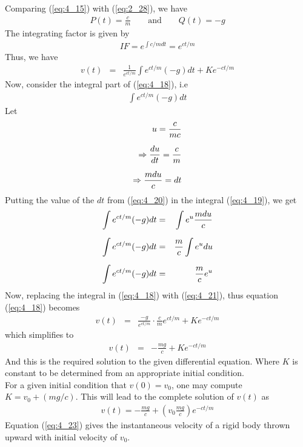 \documentclass[11pt]{report}
\newcommand{\sps}{\\[0.2cm]}
\newcommand{\refn}[1]{(\ref{#1})}
\newcommand{\refx}[1]{\refn{eq:#1}}
\newcommand{\NI}{\noindent}
\begin{document}
	\NI Comparing \refx{4_15} with \refx{2_28}, we have
	\begin{eqnarray}
		P(t) = \frac{c}{m}\qquad\text{and}\qquad Q(t) = -g\label{eq:4_16}
	\end{eqnarray}	
	The integrating factor is given by
	\begin{eqnarray}
		IF = e^{\int c/m dt} = e^{ct/m}  \label{eq:4_17}
	\end{eqnarray}
	Thus, we have
	\begin{eqnarray}
		v(t) &=& \frac{1}{e^{ct/m}}\int e^{ct/m}(-g)dt +Ke^{-ct/m}\label{eq:4_18}
	\end{eqnarray}
	Now, consider the integral part of \refx{4_18}, i.e
	\begin{eqnarray}
		\int e^{ct/m}(-g)dt\label{eq:4_19}
	\end{eqnarray}
	Let
	\begin{eqnarray}
		u = \frac{c}{mc}\notag\sps
		\Rightarrow \frac{du}{dt} = \frac{c}{m}\notag\sps
		\Rightarrow \frac{mdu}{c} = dt\label{eq:4_20}
	\end{eqnarray}
	Putting the value of the $dt$ from \refx{4_20} in the integral \refx{4_19}, we get
	\begin{eqnarray}
		\int e^{ct/m}(-g)dt &=& \int e^u\notag \frac{mdu}{c}\sps
		\int e^{ct/m}(-g)dt&=& \frac{m}{c}\int e^u du\notag\sps
		\int e^{ct/m}(-g)dt&=& \frac{m}{c}e^u\label{eq:4_21}
	\end{eqnarray}
	Now, replacing the integral in \refx{4_18} with \refx{4_21}, thus equation \refx{4_18} becomes
	\begin{eqnarray*}
		v(t) &=& \frac{-g}{e^{ct/m}} \cdot \frac{c}{m}e^{ct/m}+ Ke^{-ct/m}
	\end{eqnarray*}
	which simplifies to
	\begin{eqnarray}
		v(t) &=& -\frac{mg}{c} + Ke^{-ct/m}
	\end{eqnarray}
	And this is the required solution to the given differential equation. Where $K$ is constant to be determined from an appropriate initial condition.\sps
	
	\NI For a given initial condition that $v(0) = v_0$, one may compute $K=v_0 + (mg/c)$. This will lead to the complete solution of $v(t)$ as 
	\begin{eqnarray}
		v(t) = -\frac{mg}{c} +\left(v_0\frac{mg}{c}\right)e^{-ct/m}\label{eq:4_23}
	\end{eqnarray}
	Equation \refx{4_23} gives the instantaneous velocity of a rigid body thrown upward with initial velocity of $v_0$.\sps
	
\end{document}
